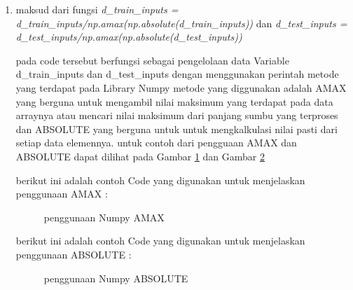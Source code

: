 \begin{enumerate}
\item maksud dari fungsi \emph{d\_train\_inputs = d\_train\_inputs/np.amax(np.absolute(d\_train\_inputs))} dan \emph{d\_test\_inputs = d\_test\_inputs/np.amax(np.absolute(d\_test\_inputs))}

\par pada code tersebut berfungsi sebagai pengelolaan data Variable d\_train\_inputs dan d\_test\_inputs dengan menggunakan perintah metode yang terdapat pada Library Numpy metode yang diggunakan adalah AMAX yang berguna untuk mengambil nilai maksimum yang terdapat pada data arraynya atau mencari nilai maksimum dari panjang sumbu yang terproses dan ABSOLUTE yang berguna untuk untuk mengkalkulasi nilai pasti dari setiap data elemennya. untuk contoh dari pengguaan AMAX dan ABSOLUTE dapat dilihat pada Gambar \ref{data7} dan Gambar \ref{data8}

\par berikut ini adalah contoh Code yang digunakan untuk menjelaskan penggunaan AMAX :
\begin{figure}[!htbp]
      \caption{penggunaan Numpy AMAX}
      \label{data7}
\end{figure}

\par berikut ini adalah contoh Code yang digunakan untuk menjelaskan penggunaan ABSOLUTE :
\begin{figure}[!htbp]
      \caption{penggunaan Numpy ABSOLUTE}
      \label{data8}
\end{figure}


\end{enumerate}
